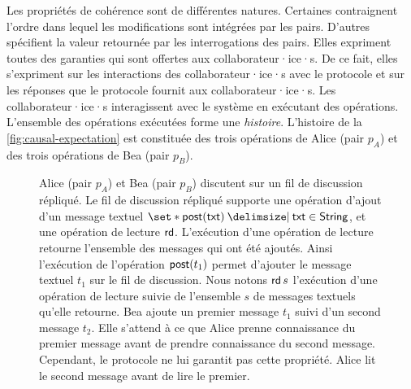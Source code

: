 Les propriétés de cohérence sont de différentes natures.
Certaines contraignent l'ordre dans lequel les modifications sont intégrées par les pairs.
D'autres spécifient la valeur retournée par les interrogations des pairs.
Elles expriment toutes des garanties qui sont offertes aux collaborateur·ice·s.
De ce fait, elles s'expriment sur les interactions des collaborateur·ice·s avec le protocole et sur les réponses que le protocole fournit aux collaborateur·ice·s.
Les collaborateur·ice·s interagissent avec le système en exécutant des opérations.
L'ensemble des opérations exécutées forme une \emph{histoire}.
L'histoire de la \autoref{fig:causal-expectation} est constituée des trois opérations de Alice (pair $p_A$) et des trois opérations de Bea (pair $p_B$).

\clearpage

\begin{figure}[htb]
\centering
{}
\caption[Attentes des collaborateur·ice·s]{Alice (pair $p_A$) et Bea (pair $p_B$) discutent sur un fil de discussion répliqué.
Le fil de discussion répliqué supporte une opération d'ajout d'un message textuel $\set*{\trm{post}(\trm{txt}) \given \trm{txt} \in \trm{String} }$, et une opération de lecture $\operatorname{\mathsf{rd}}$.
L'exécution d'une opération de lecture retourne l'ensemble des messages qui ont été ajoutés.
Ainsi l'exécution de l'opération $\operatorname{\mathsf{post}}(t_1)$ permet d'ajouter le message textuel $t_1$ sur le fil de discussion.
Nous notons $\operatorname{\mathsf{rd}} s$ l'exécution d'une opération de lecture suivie de l'ensemble $s$ de messages textuels qu'elle retourne.
Bea ajoute un premier message $t_1$ suivi d'un second message $t_2$.
Elle s'attend à ce que Alice prenne connaissance du premier message avant de prendre connaissance du second message.
Cependant, le protocole ne lui garantit pas cette propriété.
Alice lit le second message avant de lire le premier.}\label{fig:causal-expectation}
\end{figure}

